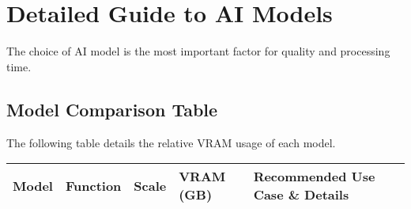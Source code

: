 \documentclass[11pt, a4paper]{article}
\begin{document}
\section{Detailed Guide to AI Models}
The choice of AI model is the most important factor for quality and processing time.

\subsection{Model Comparison Table}
The following table details the relative VRAM usage of each model.
\begin{longtable}{p{2.8cm} p{1.8cm} p{1.2cm} p{1.5cm} p{7.2cm}}
\toprule
\textbf{Model} & \textbf{Function} & \textbf{Scale} & \textbf{VRAM (GB)} & \textbf{Recommended Use Case \& Details} \\
\midrule
\endhead %


\end{longtable}
\end{document}
